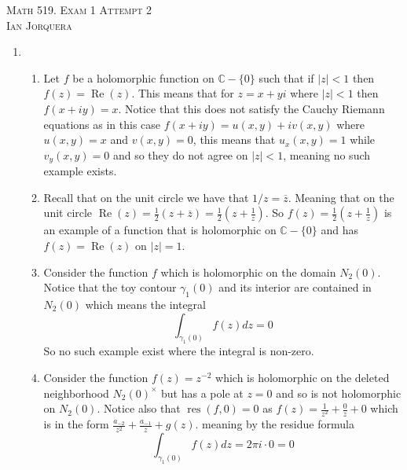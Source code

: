 \documentclass[12pt]{amsart}
\theoremstyle{definition}
\newcommand{\C}{\mathbb{C}}
\DeclareMathOperator{\Real}{\mathrm{Re}}
\DeclareMathOperator{\res}{\mathrm{res}}
\newcommand{\overbar}[1]{\overline{#1}}
\begin{document}
\begin{center}
    \textsc{Math 519. Exam 1 Attempt 2\\ Ian Jorquera}
\end{center}
\vspace{1em}

\begin{enumerate}
\item
\begin{enumerate}
    \item Let $f$ be a holomorphic function on $\C-\{0\}$ such that if $|z|<1$ then $f(z)=\Real(z)$. This means that for $z=x+yi$ where $|z|<1$ then $f(x+iy)=x$. Notice that this does not satisfy the Cauchy Riemann equations as in this case $f(x+iy)=u(x,y)+iv(x,y)$ where $u(x,y)=x$ and $v(x,y)=0$, this means that $u_x(x,y)=1$ while $v_y(x,y)=0$ and so they do not agree on $|z|< 1$, meaning no such example exists.\\
    
    \item  Recall that on the unit circle we have that $1/z=\overbar{z}$. Meaning that on the unit circle $\Real(z)=\frac{1}{2}(z+\overbar{z})=\frac{1}{2}(z+\frac{1}{z})$. So $f(z)=\frac{1}{2}(z+\frac{1}{z})$ is an example of a function that is holomorphic on $\C-\{0\}$ and has $f(z)=\Real(z)$ on $|z|=1$.\\ %

    \item Consider the function $f$ which is holomorphic on the domain $N_2(0)$. Notice that the toy contour $\gamma_1(0)$ and its interior are contained in $N_2(0)$ which means the integral $$\int_{\gamma_1(0)}f(z)dz=0$$
    So no such example exist where the integral is non-zero.\\

    \item Consider the function $f(z)=z^{-2}$ which is holomorphic on the deleted neighborhood $N_2(0)^\times$ but has a pole at $z=0$ and so is not holomorphic on $N_2(0)$. Notice also that $\res(f,0)=0$ as $f(z)=\frac{1}{z^2}+\frac{0}{z}+0$ which is in the form $\frac{a_{-2}}{z^2}+\frac{a_{-1}}{z}+g(z)$. meaning by the residue formula
    $$\int_{\gamma_1(0)}f(z)dz=2\pi i\cdot 0=0$$
\end{enumerate}


\end{enumerate}
\end{document}
